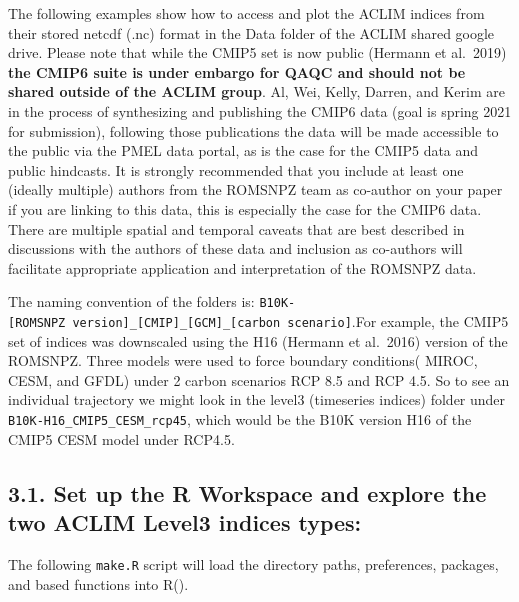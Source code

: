 \documentclass[
]{article}
\newenvironment{Shaded}{\begin{snugshade}}{\end{snugshade}}
\newcommand{\CommentTok}[1]{\textcolor[rgb]{0.56,0.35,0.01}{\textit{#1}}}
\newcommand{\KeywordTok}[1]{\textcolor[rgb]{0.13,0.29,0.53}{\textbf{#1}}}
\newcommand{\NormalTok}[1]{#1}
\newcommand{\StringTok}[1]{\textcolor[rgb]{0.31,0.60,0.02}{#1}}
\begin{document}
The following examples show how to access and plot the ACLIM indices
from their stored netcdf (.nc) format in the Data folder of the ACLIM
shared google drive. Please note that while the CMIP5 set is now public
(Hermann et al.~2019) \textbf{the CMIP6 suite is under embargo for QAQC
and should not be shared outside of the ACLIM group}. Al, Wei, Kelly,
Darren, and Kerim are in the process of synthesizing and publishing the
CMIP6 data (goal is spring 2021 for submission), following those
publications the data will be made accessible to the public via the PMEL
data portal, as is the case for the CMIP5 data and public hindcasts. It
is strongly recommended that you include at least one (ideally multiple)
authors from the ROMSNPZ team as co-author on your paper if you are
linking to this data, this is especially the case for the CMIP6 data.
There are multiple spatial and temporal caveats that are best described
in discussions with the authors of these data and inclusion as
co-authors will facilitate appropriate application and interpretation of
the ROMSNPZ data.

The naming convention of the folders is:
\texttt{B10K-{[}ROMSNPZ\ version{]}\_{[}CMIP{]}\_{[}GCM{]}\_{[}carbon\ scenario{]}}.For
example, the CMIP5 set of indices was downscaled using the H16 (Hermann
et al.~2016) version of the ROMSNPZ. Three models were used to force
boundary conditions( MIROC, CESM, and GFDL) under 2 carbon scenarios RCP
8.5 and RCP 4.5. So to see an individual trajectory we might look in the
level3 (timeseries indices) folder under
\texttt{B10K-H16\_CMIP5\_CESM\_rcp45}, which would be the B10K version
H16 of the CMIP5 CESM model under RCP4.5.

\hypertarget{set-up-the-r-workspace-and-explore-the-two-aclim-level3-indices-types}{%
\subsection{3.1. Set up the R Workspace and explore the two ACLIM Level3
indices
types:}\label{set-up-the-r-workspace-and-explore-the-two-aclim-level3-indices-types}}

The following \texttt{make.R} script will load the directory paths,
preferences, packages, and based functions into R().

\begin{Shaded}
\end{Shaded}
\end{document}
